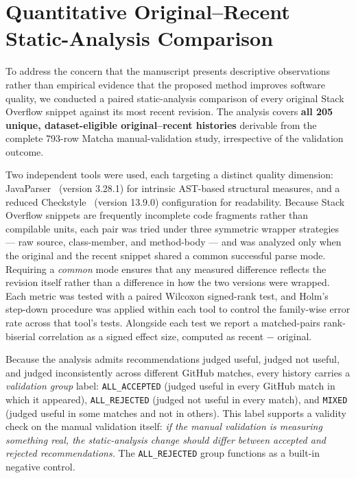 \section{Quantitative Original--Recent Static-Analysis Comparison}
\label{sec:original-recent}

To address the concern that the manuscript presents descriptive observations rather than empirical evidence that the proposed method improves software quality, we conducted a paired static-analysis comparison of every original Stack Overflow snippet against its most recent revision.
The analysis covers \textbf{all 205 unique, dataset-eligible original--recent histories} derivable from the complete 793-row Matcha manual-validation study, irrespective of the validation outcome.

Two independent tools were used, each targeting a distinct quality dimension: JavaParser~\cite{javaparser,javaparser-visited} (version 3.28.1) for intrinsic AST-based structural measures, and a reduced Checkstyle~\cite{checkstyle} (version 13.9.0) configuration for readability.
Because Stack Overflow snippets are frequently incomplete code fragments rather than compilable units, each pair was tried under three symmetric wrapper strategies --- raw source, class-member, and method-body --- and was analyzed only when the original and the recent snippet shared a common successful parse mode.
Requiring a \emph{common} mode ensures that any measured difference reflects the revision itself rather than a difference in how the two versions were wrapped.
Each metric was tested with a paired Wilcoxon signed-rank test, and Holm's step-down procedure was applied within each tool to control the family-wise error rate across that tool's tests.
Alongside each test we report a matched-pairs rank-biserial correlation as a signed effect size, computed as recent $-$ original.

Because the analysis admits recommendations judged useful, judged not useful, and judged inconsistently across different GitHub matches, every history carries a \emph{validation group} label: \texttt{ALL\_ACCEPTED} (judged useful in every GitHub match in which it appeared), \texttt{ALL\_REJECTED} (judged not useful in every match), and \texttt{MIXED} (judged useful in some matches and not in others).
This label supports a validity check on the manual validation itself: \emph{if the manual validation is measuring something real, the static-analysis change should differ between accepted and rejected recommendations.}
The \texttt{ALL\_REJECTED} group functions as a built-in negative control.

